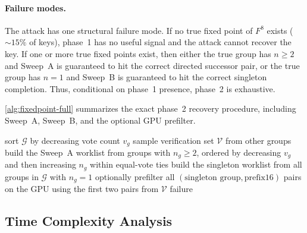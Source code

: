 \documentclass[version=preprint]{iacrcc}
\begin{document}
\paragraph{Failure modes.}
The attack has one structural failure mode.
If no true fixed point of $F^8$ exists ($\sim 15\%$ of keys), phase~1 has no useful signal and the attack cannot recover the key.
If one or more true fixed points exist, then either the true group has $n \geq 2$ and Sweep~A is guaranteed to hit the correct directed successor pair, or the true group has $n = 1$ and Sweep~B is guaranteed to hit the correct singleton completion.
Thus, conditional on phase~1 presence, phase~2 is exhaustive.

\autoref{alg:fixedpoint-full} summarizes the exact phase~2 recovery procedure, including Sweep~A, Sweep~B, and the optional GPU prefilter.

\begin{algorithm}[htbp]
\caption{Phase~2: fixed point key recovery}\label{alg:fixedpoint-full}
\small
\SetAlgoLined
{}
sort $\mathcal{G}$ by decreasing vote count $v_g$\;
sample verification set $\mathcal{V}$ from other groups\;
build the Sweep~A worklist from groups with $n_g \geq 2$, ordered by decreasing $v_g$ and then increasing $n_g$ within equal-vote ties\;
build the singleton worklist from all groups in $\mathcal{G}$ with $n_g = 1$\;
optionally prefilter all $(\text{singleton group},\text{prefix16})$ pairs on the GPU using the first two pairs from $\mathcal{V}$\;
\Return failure\;
\end{algorithm}

\subsection{Time Complexity Analysis}
\end{document}

